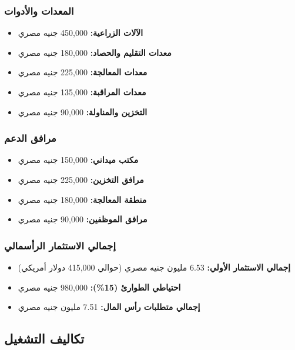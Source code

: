 \subsubsection{المعدات والأدوات}
\begin{itemize}
    \item \textbf{الآلات الزراعية:} 450,000 جنيه مصري
    \item \textbf{معدات التقليم والحصاد:} 180,000 جنيه مصري
    \item \textbf{معدات المعالجة:} 225,000 جنيه مصري
    \item \textbf{معدات المراقبة:} 135,000 جنيه مصري
    \item \textbf{التخزين والمناولة:} 90,000 جنيه مصري
\end{itemize}

\subsubsection{مرافق الدعم}
\begin{itemize}
    \item \textbf{مكتب ميداني:} 150,000 جنيه مصري
    \item \textbf{مرافق التخزين:} 225,000 جنيه مصري
    \item \textbf{منطقة المعالجة:} 180,000 جنيه مصري
    \item \textbf{مرافق الموظفين:} 90,000 جنيه مصري
\end{itemize}

\subsubsection{إجمالي الاستثمار الرأسمالي}
\begin{itemize}
    \item \textbf{إجمالي الاستثمار الأولي:} 6.53 مليون جنيه مصري (حوالي 415,000 دولار أمريكي)
    \item \textbf{احتياطي الطوارئ (15\%):} 980,000 جنيه مصري
    \item \textbf{إجمالي متطلبات رأس المال:} 7.51 مليون جنيه مصري
\end{itemize}

\subsection{تكاليف التشغيل}

